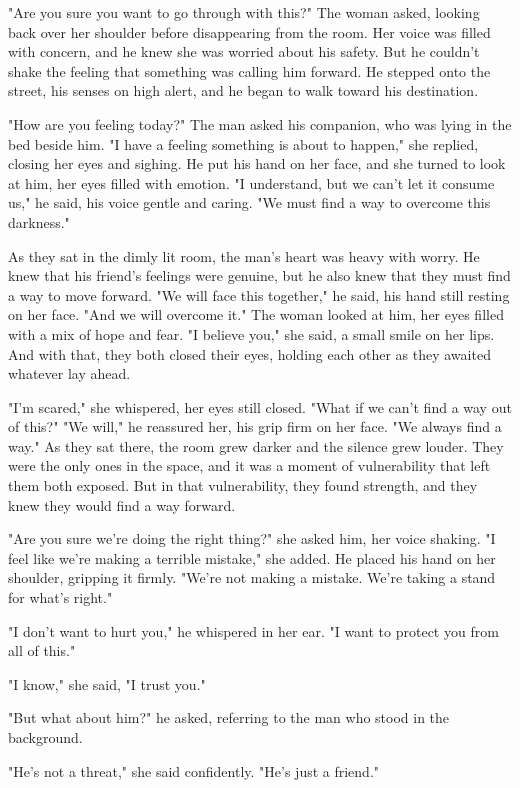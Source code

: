 \documentclass[smalldemyvopaper,11pt,twoside,onecolumn,openright,extrafontsizes]{memoir}
\begin{document}
"Are you sure you want to go through with this?" The woman asked, looking back over her shoulder before disappearing from the room. Her voice was filled with concern, and he knew she was worried about his safety. But he couldn't shake the feeling that something was calling him forward. He stepped onto the street, his senses on high alert, and he began to walk toward his destination.\par
"How are you feeling today?" The man asked his companion, who was lying in the bed beside him. "I have a feeling something is about to happen," she replied, closing her eyes and sighing. He put his hand on her face, and she turned to look at him, her eyes filled with emotion. "I understand, but we can't let it consume us," he said, his voice gentle and caring. "We must find a way to overcome this darkness."\par
As they sat in the dimly lit room, the man's heart was heavy with worry. He knew that his friend's feelings were genuine, but he also knew that they must find a way to move forward. "We will face this together," he said, his hand still resting on her face. "And we will overcome it." The woman looked at him, her eyes filled with a mix of hope and fear. "I believe you," she said, a small smile on her lips. And with that, they both closed their eyes, holding each other as they awaited whatever lay ahead.\par
"I'm scared," she whispered, her eyes still closed. "What if we can't find a way out of this?" "We will," he reassured her, his grip firm on her face. "We always find a way." As they sat there, the room grew darker and the silence grew louder. They were the only ones in the space, and it was a moment of vulnerability that left them both exposed. But in that vulnerability, they found strength, and they knew they would find a way forward.\par
"Are you sure we're doing the right thing?" she asked him, her voice shaking. "I feel like we're making a terrible mistake," she added. He placed his hand on her shoulder, gripping it firmly. "We're not making a mistake. We're taking a stand for what's right."\par
"I don't want to hurt you," he whispered in her ear. "I want to protect you from all of this."\par
"I know," she said, "I trust you."\par
"But what about him?" he asked, referring to the man who stood in the background.\par
"He's not a threat," she said confidently. "He's just a friend."\par
\end{document}
